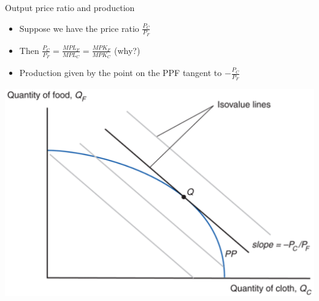 \documentclass[ignorenonframetext,]{beamer}
\begin{document}
\begin{frame}{Output price ratio and production}

    \begin{itemize}
        \item Suppose we have the price ratio $\frac{P_C}{P_F}$
        \item Then $\frac{P_C}{P_F} = \frac{MPL_F}{MPL_C} = \frac{MPK_F}{MPK_C}$ (why?)
        \item Production given by the point on the PPF tangent to $-\frac{P_C}{P_F}$
    \end{itemize}
    \includegraphics[scale=0.15]{ppf_equil.png}

\end{frame}
\end{document}
